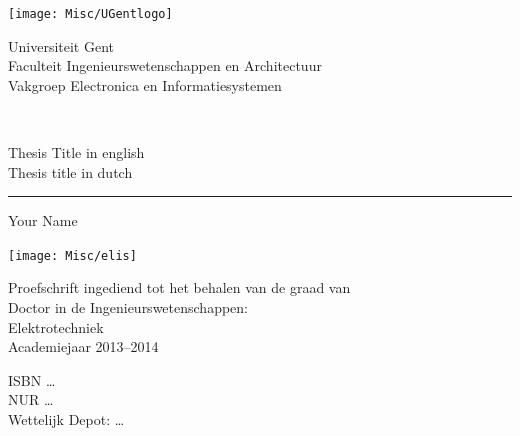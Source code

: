 \thispagestyle{empty}   %
% 
 \noindent
 \begin{minipage}{3cm}%
   \texttt{[image: Misc/UGentlogo]}%
 \end{minipage}\hfill
 \begin{minipage}{8cm}
 \raggedleft
 \textsf{Universiteit Gent\\
 Faculteit Ingenieurswetenschappen en Architectuur\\
 Vakgroep Electronica en Informatiesystemen}
 \end{minipage}\\[2cm]
% 
\bigskip
   \begin{flushleft}
     {\Large\textsf{Thesis Title in english}}\\[1cm]
     \noindent
     {\Large\textsf{Thesis title in dutch}}\\ 
\end{flushleft}
 \hrule
% 
 \bigskip
   \LARGE\noindent \textsf{Your Name} \hfill
 \bigskip

 \normalsize
% 
 \vfill
 \begin{minipage}{2.0cm}%
     \texttt{[image: Misc/elis]}%
 \end{minipage}\hfill
 \begin{minipage}{9cm}
 \raggedleft
 \textsf{Proefschrift ingediend tot het behalen van de graad van \\
 Doctor in de Ingenieurswetenschappen: \\
 Elektrotechniek \\
 Academiejaar 2013--2014}
 \end{minipage}\newpage

\thispagestyle{empty}\vspace*{\fill}
\noindent\textsf{ISBN \ldots}\\
\textsf{NUR \ldots}\\
\textsf{Wettelijk Depot: \ldots}\\\newpage

\clearpage{\pagestyle{empty}\cleardoublepage}

%

